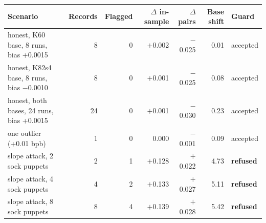{\footnotesize
\begin{tabular}{@{}p{4.6cm}rrrrrl@{}}
\toprule
Scenario & Records & Flagged & $\Delta$ in-sample & $\Delta$ pairs & Base shift & Guard \\
\midrule
honest, K60 base, 8 runs, bias +0.0015 & 8 & 0 & \ensuremath{+}0.002 & \ensuremath{-}0.025 & 0.01 & accepted \\
honest, K82s4 base, 8 runs, bias $-$0.0010 & 8 & 0 & \ensuremath{+}0.001 & \ensuremath{-}0.025 & 0.08 & accepted \\
honest, both bases, 24 runs, bias +0.0015 & 24 & 0 & \ensuremath{+}0.001 & \ensuremath{-}0.030 & 0.23 & accepted \\
one outlier (+0.01 bpb) & 1 & 0 & 0.000 & \ensuremath{-}0.001 & 0.09 & accepted \\
slope attack, 2 sock puppets & 2 & 1 & \ensuremath{+}0.128 & \ensuremath{+}0.022 & 4.73 & \textbf{refused} \\
slope attack, 4 sock puppets & 4 & 2 & \ensuremath{+}0.133 & \ensuremath{+}0.027 & 5.11 & \textbf{refused} \\
slope attack, 8 sock puppets & 8 & 4 & \ensuremath{+}0.139 & \ensuremath{+}0.028 & 5.42 & \textbf{refused} \\
\bottomrule
\end{tabular}
}
